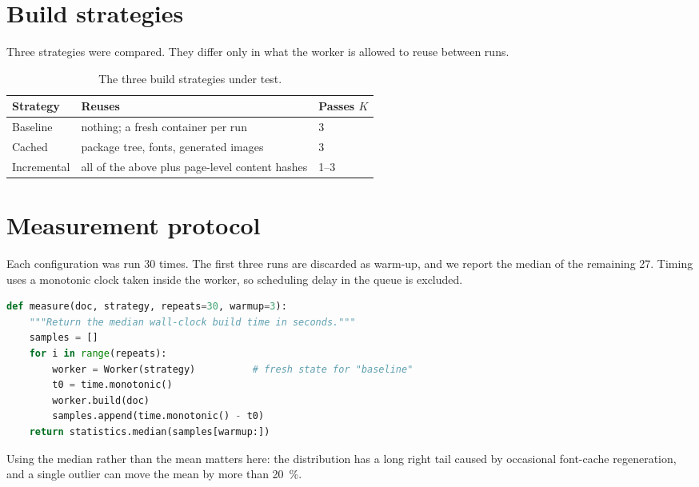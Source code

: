 \section{Build strategies}

Three strategies were compared. They differ only in what the worker is
allowed to reuse between runs.

\begin{table}[htbp]
  \centering
  \caption{The three build strategies under test.}
  \label{tab:strategies}
  \small
  \begin{tabularx}{\textwidth}{@{}l L l@{}}
    \toprule
    \textbf{\sffamily Strategy} & \textbf{\sffamily Reuses} & \textbf{\sffamily Passes $K$} \\
    \midrule
    Baseline     & nothing; a fresh container per run            & 3 \\
    Cached       & package tree, fonts, generated images          & 3 \\
    Incremental  & all of the above plus page-level content hashes & 1--3 \\
    \bottomrule
  \end{tabularx}
\end{table}

\section{Measurement protocol}

Each configuration was run \num{30} times. The first three runs are
discarded as warm-up, and we report the median of the remaining
\num{27}. Timing uses a monotonic clock taken inside the worker, so
scheduling delay in the queue is excluded.

\begin{lstlisting}[language=Python,caption={Core of the timing loop.},label={lst:timing}]
def measure(doc, strategy, repeats=30, warmup=3):
    """Return the median wall-clock build time in seconds."""
    samples = []
    for i in range(repeats):
        worker = Worker(strategy)          # fresh state for "baseline"
        t0 = time.monotonic()
        worker.build(doc)
        samples.append(time.monotonic() - t0)
    return statistics.median(samples[warmup:])
\end{lstlisting}

\begin{remark}
Using the median rather than the mean matters here: the distribution has
a long right tail caused by occasional font-cache regeneration, and a
single outlier can move the mean by more than \qty{20}{\percent}.
\end{remark}
